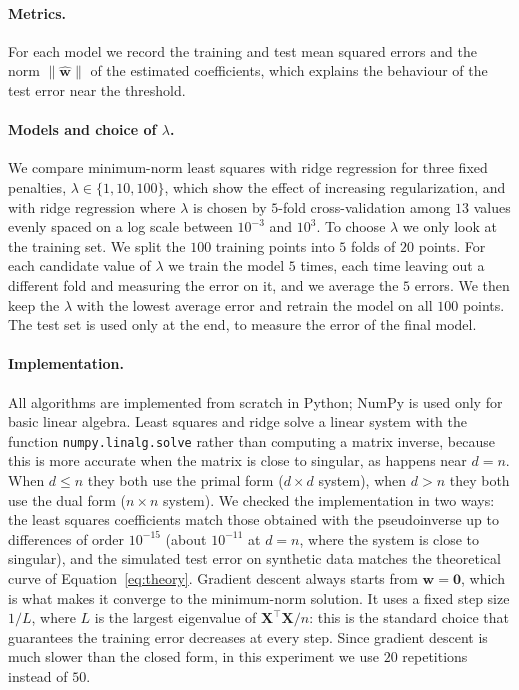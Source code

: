 \documentclass[11pt,a4paper]{article}
\begin{document}
\paragraph{Metrics.}
For each model we record the training and test mean squared errors and the
norm $\|\hat{\mathbf{w}}\|$ of the estimated coefficients, which explains
the behaviour of the test error near the threshold.

\paragraph{Models and choice of $\lambda$.}
We compare minimum-norm least squares with ridge regression for three fixed
penalties, $\lambda \in \{1, 10, 100\}$, which show the effect of increasing
regularization, and with ridge regression where $\lambda$ is chosen by
$5$-fold cross-validation among $13$ values evenly spaced on a log scale
between $10^{-3}$ and $10^{3}$. To choose $\lambda$ we only look at the training set. We split the $100$
training points into $5$ folds of $20$ points. For each candidate value of
$\lambda$ we train the model $5$ times, each time leaving out a different
fold and measuring the error on it, and we average the $5$ errors. We then
keep the $\lambda$ with the lowest average error and retrain the model on
all $100$ points. The test set is used only at the end, to measure the error
of the final model.

\paragraph{Implementation.}
All algorithms are implemented from scratch in Python; NumPy is used only for
basic linear algebra.
Least squares and ridge solve a linear system with the function
\texttt{numpy.linalg.solve} rather than computing a matrix inverse, because
this is more accurate when the matrix is close to singular, as happens near
$d = n$.
When $d \le n$ they both use the primal form ($d \times d$ system), when 
$d > n$ they both use the dual form ($n \times n$ system).
We checked the
implementation in two ways: the least squares coefficients match those
obtained with the pseudoinverse up to differences of order $10^{-15}$
(about $10^{-11}$ at $d = n$, where the system is close to singular), and
the simulated test error on synthetic data matches the theoretical curve of
Equation~\eqref{eq:theory}. Gradient descent always starts from $\mathbf{w} = \mathbf{0}$, which is what
makes it converge to the minimum-norm solution. It uses a fixed step size
$1/L$, where $L$ is the largest eigenvalue of
$\mathbf{X}^\top \mathbf{X} / n$: this is the standard choice that
guarantees the training error decreases at every step. Since gradient
descent is much slower than the closed form, in this experiment we use
$20$ repetitions instead of $50$.
\end{document}
